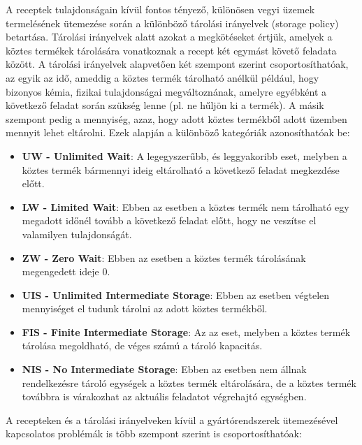 A receptek tulajdonságain kívül fontos tényező, különösen vegyi üzemek termelésének ütemezése során a különböző tárolási irányelvek (storage policy) betartása.\cite{phd_Hegyhati}
Tárolási irányelvek alatt azokat a megkötéseket értjük, amelyek a köztes termékek tárolására vonatkoznak a recept két egymást követő feladata között.
A tárolási irányelvek alapvetően két szempont szerint csoportosíthatóak, az egyik az idő, ameddig a köztes termék tárolható anélkül például, hogy bizonyos kémia, fizikai tulajdonságai megváltoznának, amelyre egyébként a következő feladat során szükség lenne (pl. ne hűljön ki a termék).
A másik szempont pedig a mennyiség, azaz, hogy adott köztes termékből adott üzemben mennyit lehet eltárolni.
Ezek alapján a különböző kategóriák azonosíthatóak be:
\begin{itemize}
\item[]\textbf{UW - Unlimited Wait}: A legegyszerűbb, és leggyakoribb eset, melyben a köztes termék bármennyi ideig eltárolható a következő feladat megkezdése előtt.
\item[]\textbf{LW - Limited Wait}: Ebben az esetben a köztes termék nem tárolható egy megadott időnél tovább a következő feladat előtt, hogy ne veszítse el valamilyen tulajdonságát.
\item[]\textbf{ZW - Zero Wait}: Ebben az esetben a köztes termék tárolásának megengedett ideje 0.
\item[]\textbf{UIS - Unlimited Intermediate Storage}: Ebben az esetben végtelen mennyiséget el tudunk tárolni az adott köztes termékből.
\item[]\textbf{FIS - Finite Intermediate Storage}: Az az eset, melyben a köztes termék tárolása megoldható, de véges számú a tároló kapacitás.
\item[]\textbf{NIS - No Intermediate Storage}: Ebben az esetben nem állnak rendelkezésre tároló egységek a köztes termék eltárolására, de a köztes termék továbbra is várakozhat az aktuális feladatot végrehajtó egységben.
\end{itemize}
A recepteken és a tárolási irányelveken kívül a gyártórendszerek ütemezésével kapcsolatos problémák is több szempont szerint is csoportosíthatóak\cite{phd_Hegyhati}:
